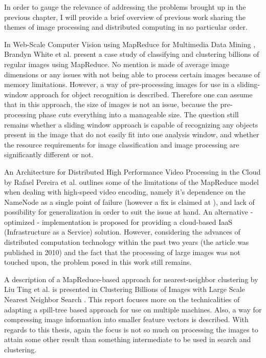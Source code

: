\documentclass [12pt,a4paper]{report}
\begin{document}
In order to gauge the relevance of addressing the problems brought up in the previous chapter, I will provide a brief overview of previous work sharing the themes of image processing and distributed computing in no particular order. 

In Web-Scale Computer Vision using MapReduce for Multimedia Data Mining \cite{White:2010:WCV:1814245.1814254}, Brandyn White et al. present a case study of classifying and clustering billions of regular images using MapReduce. No mention is made of average image dimensions or any issues with not being able to process certain images because of memory limitations. However, a way of pre-processing images for use in a sliding-window approach for object recognition is described. Therefore one can assume that in this approach, the size of images is not an issue, because the pre-processing phase cuts everything into a manageable size. The question still remains whether a sliding window approach is capable of recognizing any objects present in the image that do not easily fit into one analysis window, and whether the resource requirements for image classification and image processing are significantly different or not.

An Architecture for Distributed High Performance Video Processing in the Cloud \cite{Pereira:2010:ADH:1844768.1845374} by Rafael Pereira et al. outlines some of the limitations of the MapReduce model when dealing with high-speed video encoding, namely it's dependence on the NameNode as a single point of failure (however a fix is claimed at \cite{website:facebook_namenode_improvements}), and lack of possibility for generalization in order to suit the issue at hand. An alternative - optimized - implementation is proposed for providing a cloud-based IaaS (Infrastructure as a Service) solution. However, considering the advances of distributed computation technology within the past two years (the article was published in 2010) and the fact that the processing of large images was not touched upon, the problem posed in this work still remains.

A description of a MapReduce-based approach for nearest-neighbor clustering by Liu Ting et al. is presented in Clustering Billions of Images with Large Scale Nearest Neighbor Search \cite{citeulike:2631015}. This report focuses more on the technicalities of adapting a spill-tree based approach for use on multiple machines. Also, a way for compressing image information into smaller feature vectors is described. With regards to this thesis, again the focus is not so much on processing the images to attain some other result than something intermediate to be used in search and clustering.
\end{document}

